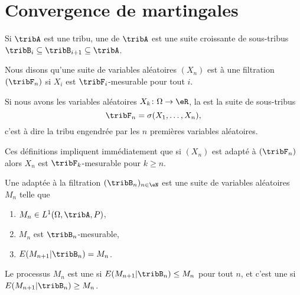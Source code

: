 
\section{Convergence de martingales}

\begin{definition}
	Si \( \tribA\) est une tribu, une  de \( \tribA\) est une suite croissante de sous-tribus \( \tribB_i\subseteq\tribB_{i+1}\subseteq\tribA\).

	Nous disons qu'une suite de variables aléatoires \( (X_n)\) est  à une filtration \( (\tribF_n)\) si \( X_i\) est \( \tribF_i\)-mesurable pour tout \( i\).
\end{definition}

\begin{definition}	\label{DEFooUNRAooOEmCsh}
	Si nous avons les variables aléatoires \(X_k \colon \Omega\to \eR  \), la  est la suite de sous-tribus
	\begin{equation}
		\tribF_n=\sigma(X_1,\ldots,X_n),
	\end{equation}
	c'est à dire la tribu engendrée par les \( n\) premières variables aléatoires.
\end{definition}


Ces définitions impliquent immédiatement que si \( (X_n)\) est adapté à \( (\tribF_n)\) alors \( X_n\) est \( \tribF_k\)-mesurable pour \( k\geq n\).

\begin{definition}		\label{DEFooESAGooUffeDa}
	Une  adaptée à la filtration \( (\tribB_n)_{n\in \eN}\) est une suite de variables aléatoires \( M_n\) telle que
	\begin{enumerate}
		\item
		      \(M_n\in L^1(\Omega,\tribA,P)\),
		\item
		      \( M_n\) est \( \tribB_n\)-mesurable,
		\item
		      \( E(M_{n+1}|\tribB_n)=M_n\).
	\end{enumerate}

	Le processus \( M_n\) est une  si \( E(M_{n+1}|\tribB_n)\leq M_n\) pour tout \( n\), et c'est une  si \( E(M_{n+1}|\tribB_n)\geq M_n\).
\end{definition}

